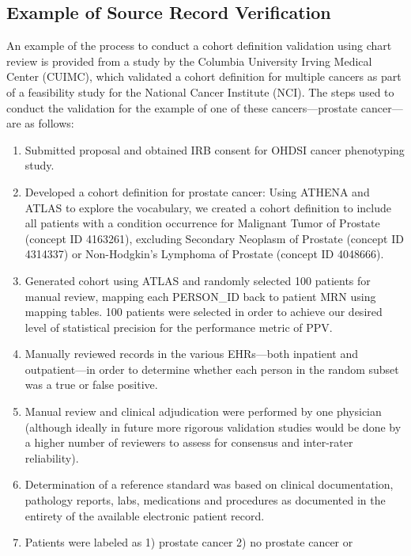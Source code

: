 \documentclass[
  letterpaper,
  paper=7in:10in,
  pagesize=pdftex,
  headinclude=on,
  footinclude=on,
  12pt]{scrbook}
\providecommand{\tightlist}{%
  \setlength{\itemsep}{0pt}\setlength{\parskip}{0pt}}\usepackage{longtable,booktabs,array}
\begin{document}
\subsection{Example of Source Record
Verification}\label{example-of-source-record-verification}

An example of the process to conduct a cohort definition validation
using chart review is provided from a study by the Columbia University
Irving Medical Center (CUIMC), which validated a cohort definition for
multiple cancers as part of a feasibility study for the National Cancer
Institute (NCI). The steps used to conduct the validation for the
example of one of these cancers---prostate cancer---are as follows:

\begin{enumerate}
\def\labelenumi{\arabic{enumi}.}
\tightlist
\item
  Submitted proposal and obtained IRB consent for OHDSI cancer
  phenotyping study.
\item
  Developed a cohort definition for prostate cancer: Using ATHENA and
  ATLAS to explore the vocabulary, we created a cohort definition to
  include all patients with a condition occurrence for Malignant Tumor
  of Prostate (concept ID 4163261), excluding Secondary Neoplasm of
  Prostate (concept ID 4314337) or Non-Hodgkin's Lymphoma of Prostate
  (concept ID 4048666).
\item
  Generated cohort using ATLAS and randomly selected 100 patients for
  manual review, mapping each PERSON\_ID back to patient MRN using
  mapping tables. 100 patients were selected in order to achieve our
  desired level of statistical precision for the performance metric of
  PPV.
\item
  Manually reviewed records in the various EHRs---both inpatient and
  outpatient---in order to determine whether each person in the random
  subset was a true or false positive.
\item
  Manual review and clinical adjudication were performed by one
  physician (although ideally in future more rigorous validation studies
  would be done by a higher number of reviewers to assess for consensus
  and inter-rater reliability).
\item
  Determination of a reference standard was based on clinical
  documentation, pathology reports, labs, medications and procedures as
  documented in the entirety of the available electronic patient record.
\item
  Patients were labeled as 1) prostate cancer 2) no prostate cancer or

\end{enumerate}
\end{document}
